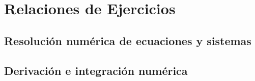 \documentclass[12pt]{book}
\begin{document}

    
    

    \renewcommand{\theejercicio}{%
    \ifnum\value{section}=0 %
        \arabic{ejercicio}%
    \else
        \thesubsection.\arabic{ejercicio}%
    \fi
    }

    \fancyhead[R]{\helv \nouppercase{\rightmark}}
    \chapter{Relaciones de Ejercicios}
    \section{Resolución numérica de ecuaciones y sistemas}
    
    
    \newpage
    \section{Derivación e integración numérica}
    
    
    
    
\end{document}
